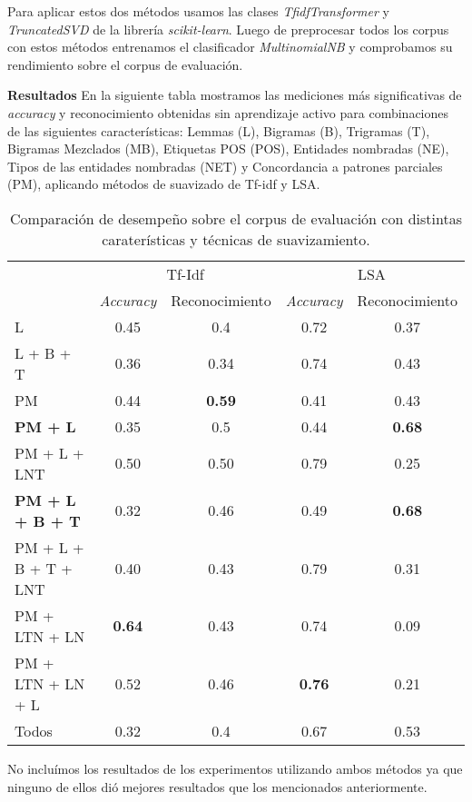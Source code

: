 Para aplicar estos dos métodos usamos las clases \textit{TfidfTransformer} y \textit{TruncatedSVD} de la librería \textit{scikit-learn}. Luego de preprocesar todos los corpus con estos métodos entrenamos el clasificador \textit{MultinomialNB} y comprobamos su rendimiento sobre el corpus de evaluación.

\vspace{3 mm}

\textbf{Resultados} En la siguiente tabla mostramos las mediciones más significativas de \textit{accuracy} y reconocimiento obtenidas sin aprendizaje activo para combinaciones de las siguientes características: Lemmas (L), Bigramas (B), Trigramas (T), Bigramas Mezclados (MB), Etiquetas POS (POS), Entidades nombradas (NE), Tipos de las entidades nombradas (NET) y Concordancia a patrones parciales (PM), aplicando métodos de suavizado de Tf-idf y LSA.

\begin{table}[h]\label{tabla-exp3}
\centering
\begin{tabular}{l c c | c c}
     & \multicolumn{2}{c|}{Tf-Idf} & \multicolumn{2}{c}{LSA}\\ [0.5ex]
     & \textit{Accuracy} & Reconocimiento & \textit{Accuracy} & Reconocimiento \\ [0.5ex]
    \hline
    L & 0.45 & 0.4 & 0.72 & 0.37 \\[0.5ex]
    L + B + T & 0.36 & 0.34 & 0.74 & 0.43 \\[0.5ex]
    PM & 0.44 & \textbf{0.59} & 0.41 & 0.43 \\[0.5ex]
    \textbf{PM + L} & 0.35 & 0.5 & 0.44 & \textbf{0.68} \\[0.5ex]
    PM + L + LNT & 0.50 & 0.50 & 0.79 & 0.25\\[0.5ex]
    \textbf{PM + L + B + T} & 0.32 & 0.46 & 0.49 & \textbf{0.68} \\[0.5ex]
    PM + L + B + T + LNT & 0.40 & 0.43 & 0.79 & 0.31 \\[0.5ex]
    PM + LTN + LN & \textbf{0.64} & 0.43 & 0.74 & 0.09 \\[0.5ex]
    PM + LTN + LN + L & 0.52 & 0.46 & \textbf{0.76} & 0.21 \\[0.5ex]
    Todos & 0.32 & 0.4 & 0.67 & 0.53 \\[0.5ex]
    \hline
\end{tabular}
\caption{Comparación de desempeño sobre el corpus de evaluación con distintas caraterísticas y técnicas de suavizamiento.}
\end{table}
No incluímos los resultados de los experimentos utilizando ambos métodos ya que ninguno de ellos dió mejores resultados que los mencionados anteriormente.


